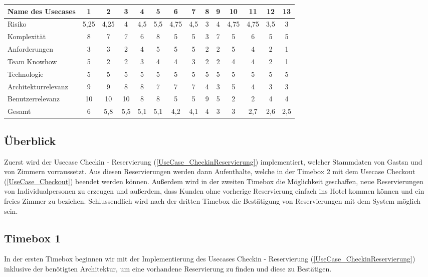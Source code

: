 \begin{tabular} { | l | c c c c c c c c c c c c c | }
	\hline
	Name des Usecases & 1 & 2 & 3 & 4 & 5 & 6 & 7 & 8 & 9 & 10 & 11 & 12 & 13 \\ \hline
	Risiko & 5,25 &	4,25 & 4 & 4,5 & 5,5 & 4,75 & 4,5 & 3 & 4 & 4,75 & 4,75 & 3,5 & 3\\
	Komplexität & 8 & 7 & 7 & 6 & 8 & 5 & 5 & 3 & 7 & 5 & 6 & 5 & 5\\
	Anforderungen & 3 & 3 & 2 & 4 & 5 & 5 & 5 & 2 & 2 & 5 & 4 & 2 & 1\\
	Team Knowhow & 5 & 2 & 2 & 3 & 4 & 4 & 3 & 2 & 2 & 4 & 4 & 2 & 1\\
	Technologie & 5 & 5 & 5 & 5 & 5 & 5 & 5 & 5  & 5 & 5 & 5 & 5 & 5\\
	\hline
	Architekturrelevanz	& 9 & 9 & 8 & 8 & 7 & 7 & 7 & 4 & 3 & 5 & 4 & 3 & 3\\
	Benutzerrelevanz & 10 & 10 & 10 & 8 & 8 & 5 & 5 & 9 & 5 & 2 & 2 & 4 & 4 \\
	\hline \hline
	Gesamt & 6 & 5,8 & 5,5 & 5,1 & 5,1 & 4,2 & 4,1 & 4 & 3 & 3 & 2,7 & 2,6 & 2,5\\
\hline
\end{tabular}



\subsection{Überblick}
Zuerst wird der Usecase Checkin - Reservierung (\ref{UseCase_CheckinReservierung}) implementiert, welcher \Gls{Stammdaten} von \Glspl{Gast}n und von \Gls{Zimmer}n vorraussetzt.
Aus diesen \Gls{Reservierung}en werden dann \Gls{Aufenthalt}e, welche in der Timebox 2 mit dem Usecase Checkout (\ref{UseCase_Checkout}) beendet werden können.
Außerdem wird in der zweiten Timebox die Möglichkeit geschaffen, neue \Gls{Reservierung}en von Individualpersonen zu erzeugen und außerdem,
dass \Gls{Kunde}n ohne vorherige \Gls{Reservierung} einfach ins Hotel kommen können und ein freies \Gls{Zimmer} zu beziehen.
Schlussendlich wird nach der dritten Timebox die Bestätigung von \Gls{Reservierung}en mit dem System möglich sein.

\subsection{Timebox 1}
In der ersten Timebox beginnen wir mit der Implementierung des Usecases Checkin - Reservierung (\ref{UseCase_CheckinReservierung}) inklusive der benötigten Architektur,
um eine vorhandene \Gls{Reservierung} zu finden und diese zu Bestätigen.

